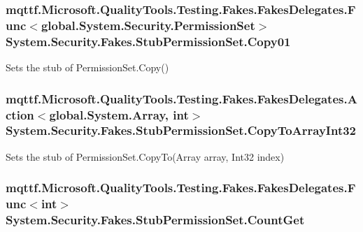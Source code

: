 \hypertarget{class_system_1_1_security_1_1_fakes_1_1_stub_permission_set_aba7e5295875fcd5cc9577d2212530ac8}{
\subsubsection[{Copy01}]{\setlength{\rightskip}{0pt plus 5cm}mqttf.\-Microsoft.\-Quality\-Tools.\-Testing.\-Fakes.\-Fakes\-Delegates.\-Func$<$global.\-System.\-Security.\-Permission\-Set$>$ System.\-Security.\-Fakes.\-Stub\-Permission\-Set.\-Copy01}}\label{class_system_1_1_security_1_1_fakes_1_1_stub_permission_set_aba7e5295875fcd5cc9577d2212530ac8}


Sets the stub of Permission\-Set.\-Copy()

\hypertarget{class_system_1_1_security_1_1_fakes_1_1_stub_permission_set_a59fc1436a7942ba4a548d53b568c4f26}{
\subsubsection[{Copy\-To\-Array\-Int32}]{\setlength{\rightskip}{0pt plus 5cm}mqttf.\-Microsoft.\-Quality\-Tools.\-Testing.\-Fakes.\-Fakes\-Delegates.\-Action$<$global.\-System.\-Array, int$>$ System.\-Security.\-Fakes.\-Stub\-Permission\-Set.\-Copy\-To\-Array\-Int32}}\label{class_system_1_1_security_1_1_fakes_1_1_stub_permission_set_a59fc1436a7942ba4a548d53b568c4f26}


Sets the stub of Permission\-Set.\-Copy\-To(\-Array array, Int32 index)

\hypertarget{class_system_1_1_security_1_1_fakes_1_1_stub_permission_set_ab189da8e31bd2a1ed4ad75b116fd453d}{
\subsubsection[{Count\-Get}]{\setlength{\rightskip}{0pt plus 5cm}mqttf.\-Microsoft.\-Quality\-Tools.\-Testing.\-Fakes.\-Fakes\-Delegates.\-Func$<$int$>$ System.\-Security.\-Fakes.\-Stub\-Permission\-Set.\-Count\-Get}}\label{class_system_1_1_security_1_1_fakes_1_1_stub_permission_set_ab189da8e31bd2a1ed4ad75b116fd453d}


